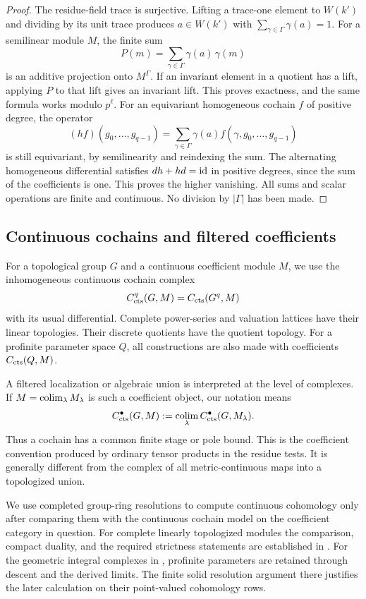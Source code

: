\begin{proof}
The residue-field trace is surjective. Lifting a trace-one element to
\(W(k')\) and dividing by its unit trace produces \(a\in W(k')\) with
\(\sum_{\gamma\in\Gamma}\gamma(a)=1\). For a semilinear module \(M\), the
finite sum
\[
 P(m)=\sum_{\gamma\in\Gamma}\gamma(a)\,\gamma(m)
\]
is an additive projection onto \(M^\Gamma\). If an invariant element
in a quotient has a lift, applying \(P\) to that lift gives an invariant
lift. This proves exactness, and the same formula works modulo
\(p^\ell\). For an equivariant homogeneous cochain \(f\) of positive
degree, the operator
\[
 (hf)(g_0,\ldots,g_{q-1})
 =\sum_{\gamma\in\Gamma}\gamma(a)
 f(\gamma,g_0,\ldots,g_{q-1})
\]
is still equivariant, by semilinearity and reindexing the sum. The
alternating homogeneous differential satisfies \(dh+hd=\mathrm{id}\) in
positive degrees, since the sum of the coefficients is one. This proves
the higher vanishing. All sums and scalar operations are finite and
continuous. No division by \(|\Gamma|\) has been made.
\end{proof}

\subsection{Continuous cochains and filtered coefficients}

For a topological group \(G\) and a continuous coefficient module \(M\),
we use the inhomogeneous continuous cochain complex
\[
 C^q_{\mathrm{cts}}(G,M)=C_{\mathrm{cts}}(G^q,M)
\]
with its usual differential. Complete power-series and valuation
lattices have their linear topologies. Their discrete quotients have
the quotient topology. For a profinite parameter space \(Q\), all
constructions are also made with coefficients
\(C_{\mathrm{cts}}(Q,M)\).

A filtered localization or algebraic union is interpreted at the level
of complexes. If \(M=\operatorname*{colim}_\lambda M_\lambda\) is such a coefficient
object, our notation means
\begin{equation}\label{h3:eq:framework-filtered-cochains}
 C^\bullet_{\mathrm{cts}}(G,M)
 :=\operatorname*{colim}_\lambda C^\bullet_{\mathrm{cts}}(G,M_\lambda).
\end{equation}
Thus a cochain has a common finite stage or pole bound. This is the
coefficient convention produced by ordinary tensor products in the
residue tests. It is generally different from the complex of all
metric-continuous maps into a topologized union.

We use completed group-ring resolutions to compute continuous
cohomology only after comparing them with the continuous cochain model
on the coefficient category in question. For complete linearly
topologized modules the comparison, compact duality, and the required
strictness statements are established in
. For the geometric integral complexes in
, profinite parameters are retained through descent
and the derived limits. The finite solid resolution argument there
justifies the later calculation on their point-valued cohomology rows.

